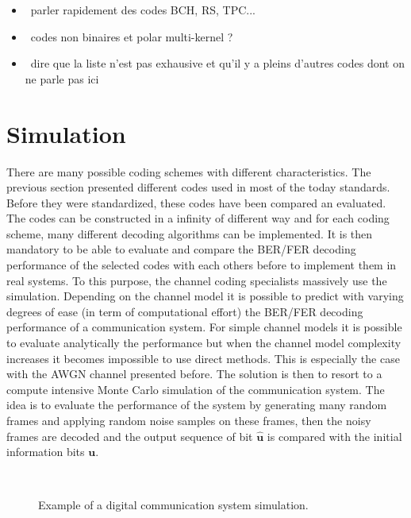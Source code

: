 \begin{itemize}
  \item \xmark~parler rapidement des codes BCH, RS, TPC...
  \item \xmark~codes non binaires et polar multi-kernel ?
  \item \xmark~dire que la liste n'est pas exhausive et qu'il y a pleins
    d'autres codes dont on ne parle pas ici
\end{itemize}

\section{Simulation}

There are many possible coding schemes with different characteristics. The
previous section presented different codes used in most of the today standards.
Before they were standardized, these codes have been compared an evaluated.
The codes can be constructed in a infinity of different way and for each coding
scheme, many different decoding algorithms can be implemented. It is then
mandatory to be able to evaluate and compare the BER/FER decoding performance of
the selected codes with each others before to implement them in real systems. To
this purpose, the channel coding specialists massively use the simulation.
Depending on the channel model it is possible to predict with varying degrees of
ease (in term of computational effort) the BER/FER decoding performance of a
communication system. For simple channel models it is possible to evaluate
analytically the performance but when the channel model complexity increases it
becomes impossible to use direct methods. This is especially the case with the
AWGN channel presented before. The solution is then to resort to a compute
intensive Monte Carlo simulation of the communication system. The idea is to
evaluate the performance of the system by generating many random frames and
applying random noise samples on these frames, then the noisy frames are decoded
and the output sequence of bit $\bm{\hat{u}}$ is compared with the initial
information bits $\bm{u}$.

\begin{figure}[htp]
  \centering
  \\
  \caption{Example of a digital communication system simulation.}
  \label{fig:simu_com_chain}
\end{figure}

